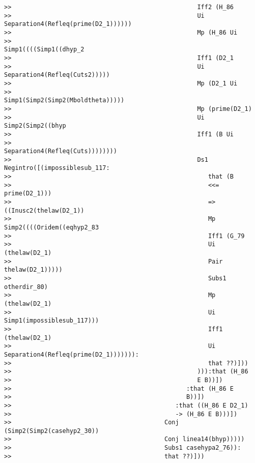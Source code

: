 \documentclass[12pt]{article}
\begin{document}
\begin{verbatim}
>>                                                   Iff2 (H_86
>>                                                   Ui Separation4(Refleq(prime(D2_1))))))
>>                                                   Mp (H_86 Ui
>>                                                   Simp1((((Simp1((dhyp_2
>>                                                   Iff1 (D2_1
>>                                                   Ui Separation4(Refleq(Cuts2)))))
>>                                                   Mp (D2_1 Ui
>>                                                   Simp1(Simp2(Simp2(Mboldtheta)))))
>>                                                   Mp (prime(D2_1)
>>                                                   Ui Simp2(Simp2((bhyp
>>                                                   Iff1 (B Ui
>>                                                   Separation4(Refleq(Cuts))))))))
>>                                                   Ds1 Negintro([(impossiblesub_117:
>>                                                      that (B
>>                                                      <<= prime(D2_1)))
>>                                                      => ((Inusc2(thelaw(D2_1))
>>                                                      Mp Simp2((((Oridem((eqhyp2_83
>>                                                      Iff1 (G_79
>>                                                      Ui (thelaw(D2_1)
>>                                                      Pair thelaw(D2_1)))))
>>                                                      Subs1 otherdir_80)
>>                                                      Mp (thelaw(D2_1)
>>                                                      Ui Simp1(impossiblesub_117)))
>>                                                      Iff1 (thelaw(D2_1)
>>                                                      Ui Separation4(Refleq(prime(D2_1))))))):
>>                                                      that ??)]))
>>                                                   ))):that (H_86
>>                                                   E B))])
>>                                                :that (H_86 E
>>                                                B))])
>>                                             :that ((H_86 E D2_1)
>>                                             -> (H_86 E B)))])
>>                                          Conj (Simp2(Simp2(casehyp2_30))
>>                                          Conj linea14(bhyp)))))
>>                                          Subs1 casehypa2_76)):
>>                                          that ??)]))

\end{verbatim}
\end{document}
